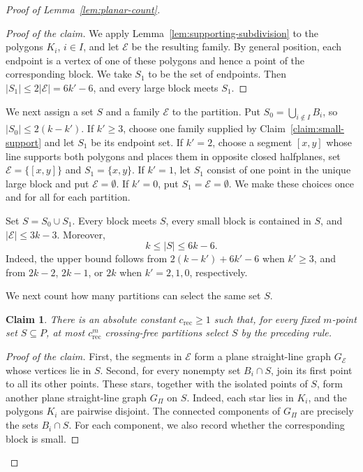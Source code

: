 \documentclass[11pt]{article}
\newtheorem{claim}[theorem]{Claim}
\theoremstyle{definition}
\newenvironment{poc}{\begin{proof}[Proof of the claim]\renewcommand*{\qedsymbol}{\(\blacksquare\)}}{\end{proof}}
\newcommand*{\abs}[1]{\lvert#1\rvert}
\begin{document}
\begin{proof}[Proof of Lemma~\ref{lem:planar-count}]
\begin{poc}
We apply Lemma~\ref{lem:supporting-subdivision} to the polygons \(K_{i}\), \(i\in I\), and let \(\mathcal{E}\) be the resulting family. By general position, each endpoint is a vertex of one of these polygons and hence a point of the corresponding block. We take \(S_{1}\) to be the set of endpoints. Then \(\abs{S_{1}}\le2\abs{\mathcal{E}}=6k'-6\), and every large block meets \(S_{1}\).
\end{poc}

We next assign a set \(S\) and a family \(\mathcal{E}\) to the partition. Put \(S_{0}=\bigcup_{i\notin I}B_{i}\), so \(\abs{S_{0}}\le2(k-k')\). If \(k'\ge3\), choose one family supplied by Claim~\ref{claim:small-support} and let \(S_{1}\) be its endpoint set. If \(k'=2\), choose a segment \([x,y]\) whose line supports both polygons and places them in opposite closed halfplanes, set \(\mathcal{E}=\{[x,y]\}\) and \(S_{1}=\{x,y\}\). If \(k'=1\), let \(S_{1}\) consist of one point in the unique large block and put \(\mathcal{E}=\emptyset\). If \(k'=0\), put \(S_{1}=\mathcal{E}=\emptyset\). We make these choices once and for all for each partition.

Set \(S=S_{0}\cup S_{1}\). Every block meets \(S\), every small block is contained in \(S\), and \(\abs{\mathcal{E}}\le3k-3\). Moreover,
\[
k\le\abs{S}\le6k-6.
\]
Indeed, the upper bound follows from \(2(k-k')+6k'-6\) when \(k'\ge3\), and from \(2k-2\), \(2k-1\), or \(2k\) when \(k'=2,1,0\), respectively.

We next count how many partitions can select the same set \(S\).

\begin{claim}\label{claim:discrete-record}
There is an absolute constant \(c_{\mathrm{rec}}\ge1\) such that, for every fixed \(m\)-point set \(S\subseteq P\), at most \(c_{\mathrm{rec}}^{m}\) crossing-free partitions select \(S\) by the preceding rule.
\end{claim}

\begin{poc}
First, the segments in \(\mathcal{E}\) form a plane straight-line graph \(G_{\mathcal{E}}\) whose vertices lie in \(S\). Second, for every nonempty set \(B_{i}\cap S\), join its first point to all its other points. These stars, together with the isolated points of \(S\), form another plane straight-line graph \(G_{\Pi}\) on \(S\). Indeed, each star lies in \(K_{i}\), and the polygons \(K_{i}\) are pairwise disjoint. The connected components of \(G_{\Pi}\) are precisely the sets \(B_{i}\cap S\). For each component, we also record whether the corresponding block is small.


\end{poc}
\end{proof}
\end{document}
